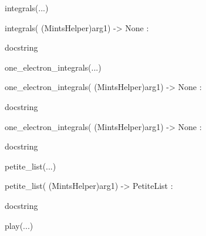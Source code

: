 \documentclass[letterpaper,10pt,english]{sphinxmanual}
\begin{document}
\begin{description}
\begin{description}
\begin{DUlineblock}{0em}
\begin{DUlineblock}{\DUlineblockindent}
\begin{DUlineblock}{\DUlineblockindent}
\end{DUlineblock}
\end{DUlineblock}
\item[] integrals(...)
\item[]
\begin{DUlineblock}{\DUlineblockindent}
\item[] integrals( (MintsHelper)arg1) -\textgreater{} None :
\item[]
\begin{DUlineblock}{\DUlineblockindent}
\item[] docstring
\item[] 
\end{DUlineblock}
\end{DUlineblock}
\item[] one\_electron\_integrals(...)
\item[]
\begin{DUlineblock}{\DUlineblockindent}
\item[] one\_electron\_integrals( (MintsHelper)arg1) -\textgreater{} None :
\item[]
\begin{DUlineblock}{\DUlineblockindent}
\item[] docstring
\item[] 
\end{DUlineblock}
\item[] one\_electron\_integrals( (MintsHelper)arg1) -\textgreater{} None :
\item[]
\begin{DUlineblock}{\DUlineblockindent}
\item[] docstring
\item[] 
\end{DUlineblock}
\end{DUlineblock}
\item[] petite\_list(...)
\item[]
\begin{DUlineblock}{\DUlineblockindent}
\item[] petite\_list( (MintsHelper)arg1) -\textgreater{} PetiteList :
\item[]
\begin{DUlineblock}{\DUlineblockindent}
\item[] docstring
\item[] 
\end{DUlineblock}
\end{DUlineblock}
\item[] play(...)
\item[]

\end{DUlineblock}
\end{description}
\end{description}
\end{document}
